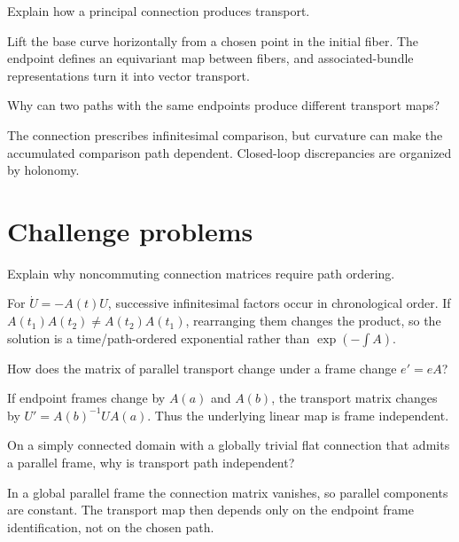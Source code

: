 \begin{problem}\label{prob:vii24-11}
Explain how a principal connection produces transport.
\end{problem}
\begin{solution}
Lift the base curve horizontally from a chosen point in the initial fiber. The endpoint defines an equivariant map between fibers, and associated-bundle representations turn it into vector transport.
\end{solution}


\begin{problem}\label{prob:vii24-12}
Why can two paths with the same endpoints produce different transport maps?
\end{problem}
\begin{solution}
The connection prescribes infinitesimal comparison, but curvature can make the accumulated comparison path dependent. Closed-loop discrepancies are organized by holonomy.
\end{solution}

\section{Challenge problems}

\begin{problem}\label{prob:vii24-ch01}
Explain why noncommuting connection matrices require path ordering.
\end{problem}
\begin{solution}
For \(\dot U=-A(t)U\), successive infinitesimal factors occur in chronological order. If \(A(t_1)A(t_2)\neq A(t_2)A(t_1)\), rearranging them changes the product, so the solution is a time/path-ordered exponential rather than \(\exp(-\int A)\).
\end{solution}


\begin{problem}\label{prob:vii24-ch02}
How does the matrix of parallel transport change under a frame change \(e'=eA\)?
\end{problem}
\begin{solution}
If endpoint frames change by \(A(a)\) and \(A(b)\), the transport matrix changes by \(U'\!=A(b)^{-1}UA(a)\). Thus the underlying linear map is frame independent.
\end{solution}


\begin{problem}\label{prob:vii24-ch03}
On a simply connected domain with a globally trivial flat connection that admits a parallel frame, why is transport path independent?
\end{problem}
\begin{solution}
In a global parallel frame the connection matrix vanishes, so parallel components are constant. The transport map then depends only on the endpoint frame identification, not on the chosen path.
\end{solution}


